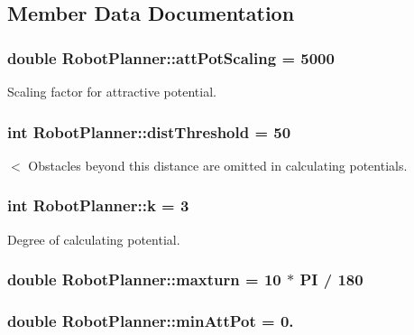 \subsection{Member Data Documentation}
\hypertarget{classRobotPlanner_aa68f0bb24256b470a8a4d13d858aef7f}{
\subsubsection[{att\-Pot\-Scaling}]{\setlength{\rightskip}{0pt plus 5cm}double Robot\-Planner\-::att\-Pot\-Scaling = 5000}}\label{classRobotPlanner_aa68f0bb24256b470a8a4d13d858aef7f}
Scaling factor for attractive potential. \hypertarget{classRobotPlanner_aa7d1571a5f12412daa58d79c518c946c}{
\subsubsection[{dist\-Threshold}]{\setlength{\rightskip}{0pt plus 5cm}int Robot\-Planner\-::dist\-Threshold = 50}}\label{classRobotPlanner_aa7d1571a5f12412daa58d79c518c946c}
$<$ Obstacles beyond this distance are omitted in calculating potentials. \hypertarget{classRobotPlanner_a18ebcf4ba23a817db1a2fda878120eb4}{
\subsubsection[{k}]{\setlength{\rightskip}{0pt plus 5cm}int Robot\-Planner\-::k = 3}}\label{classRobotPlanner_a18ebcf4ba23a817db1a2fda878120eb4}
Degree of calculating potential. \hypertarget{classRobotPlanner_a8535bc45d397cf2b10e42c6ac30ddd19}{
\subsubsection[{maxturn}]{\setlength{\rightskip}{0pt plus 5cm}double Robot\-Planner\-::maxturn = 10 $\ast$ {\bf P\-I} / 180}}\label{classRobotPlanner_a8535bc45d397cf2b10e42c6ac30ddd19}
\hypertarget{classRobotPlanner_a199d479764e8e96c37654486ddc1ef7d}{
\subsubsection[{min\-Att\-Pot}]{\setlength{\rightskip}{0pt plus 5cm}double Robot\-Planner\-::min\-Att\-Pot = 0.}}\label{classRobotPlanner_a199d479764e8e96c37654486ddc1ef7d}
